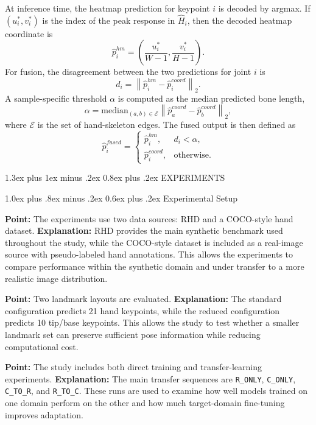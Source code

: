 \documentclass[10pt,letterpaper]{article}
\makeatletter
\renewcommand\section{\@startsection{section}{1}{\z@}%
  {1.3ex plus 1ex minus .2ex}%
  {0.8ex plus .2ex}%
  {\centering\normalfont\small\scshape}}
\renewcommand\subsection{\@startsection{subsection}{2}{\z@}%
  {1.0ex plus .8ex minus .2ex}%
  {0.6ex plus .2ex}%
  {\normalfont\itshape}}
\makeatother
\begin{document}
At inference time, the heatmap prediction for keypoint $i$ is decoded by argmax. If $(u_i^*, v_i^*)$ is the index of the peak response in $\hat{H}_i$, then the decoded heatmap coordinate is
\[
\hat{p}^{hm}_i =
\left(
\frac{u_i^*}{W-1},
\frac{v_i^*}{H-1}
\right).
\]
For fusion, the disagreement between the two predictions for joint $i$ is
\[
d_i = \left\| \hat{p}^{hm}_i - \hat{p}^{coord}_i \right\|_2.
\]
A sample-specific threshold $\alpha$ is computed as the median predicted bone length,
\[
\alpha = \mathrm{median}_{(a,b)\in \mathcal{E}}
\left\| \hat{p}^{coord}_a - \hat{p}^{coord}_b \right\|_2,
\]
where $\mathcal{E}$ is the set of hand-skeleton edges. The fused output is then defined as
\[
\hat{p}^{fused}_i =
\begin{cases}
\hat{p}^{hm}_i, & d_i < \alpha, \\
\hat{p}^{coord}_i, & \text{otherwise.}
\end{cases}
\]

\section{EXPERIMENTS}

\subsection{Experimental Setup}

\noindent\textbf{Point:} The experiments use two data sources: RHD and a COCO-style hand dataset.  
\textbf{Explanation:} RHD provides the main synthetic benchmark used throughout the study, while the COCO-style dataset is included as a real-image source with pseudo-labeled hand annotations. This allows the experiments to compare performance within the synthetic domain and under transfer to a more realistic image distribution.

\medskip
\noindent\textbf{Point:} Two landmark layouts are evaluated.  
\textbf{Explanation:} The standard configuration predicts 21 hand keypoints, while the reduced configuration predicts 10 tip/base keypoints. This allows the study to test whether a smaller landmark set can preserve sufficient pose information while reducing computational cost.

\medskip
\noindent\textbf{Point:} The study includes both direct training and transfer-learning experiments.  
\textbf{Explanation:} The main transfer sequences are \texttt{R\_ONLY}, \texttt{C\_ONLY}, \texttt{C\_TO\_R}, and \texttt{R\_TO\_C}. These runs are used to examine how well models trained on one domain perform on the other and how much target-domain fine-tuning improves adaptation.
\end{document}
